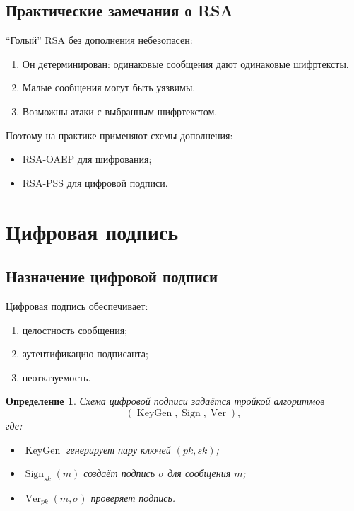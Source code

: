 \documentclass[12pt,a4paper]{article}
\newtheorem{definition}{Определение}
\DeclareMathOperator{\Sign}{Sign}
\DeclareMathOperator{\Ver}{Ver}
\DeclareMathOperator{\KeyGen}{KeyGen}
\begin{document}
\subsection{Практические замечания о RSA}

``Голый'' RSA без дополнения небезопасен:

\begin{enumerate}
    \item Он детерминирован: одинаковые сообщения дают одинаковые шифртексты.
    \item Малые сообщения могут быть уязвимы.
    \item Возможны атаки с выбранным шифртекстом.
\end{enumerate}

Поэтому на практике применяют схемы дополнения:

\begin{itemize}
    \item RSA-OAEP для шифрования;
    \item RSA-PSS для цифровой подписи.
\end{itemize}

\section{Цифровая подпись}

\subsection{Назначение цифровой подписи}

Цифровая подпись обеспечивает:

\begin{enumerate}
    \item целостность сообщения;
    \item аутентификацию подписанта;
    \item неотказуемость.
\end{enumerate}

\begin{definition}
Схема цифровой подписи задаётся тройкой алгоритмов
\[
    (\KeyGen,\Sign,\Ver),
\]
где:
\begin{itemize}
    \item $\KeyGen$ генерирует пару ключей $(pk,sk)$;
    \item $\Sign_{sk}(m)$ создаёт подпись $\sigma$ для сообщения $m$;
    \item $\Ver_{pk}(m,\sigma)$ проверяет подпись.
\end{itemize}
\end{definition}
\end{document}
